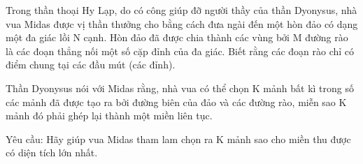 Trong thần thoại Hy Lạp, do có công giúp đỡ người thầy của thần Dyonysus, nhà vua Midas được vị thần thưởng cho bằng  cách đưa ngài đến một hòn đảo có dạng một đa giác lồi N cạnh. Hòn đảo đã được chia thành các vùng bởi M đường rào là các đoạn thẳng nối một số cặp đỉnh của đa giác. Biết rằng các đoạn rào chỉ có điểm chung tại các đầu mút (các đỉnh).   


   Thần Dyonysus nói với Midas rằng, nhà vua có thể chọn K mảnh bất kì trong số các mảnh đã được tạo ra bởi đường biên của đảo và các đường rào, miễn sao K mảnh đó phải ghép lại thành một miền liên tục.   


   Yêu cầu: Hãy giúp vua Midas tham lam chọn ra K mảnh sao cho miền thu được có diện tích lớn nhất.